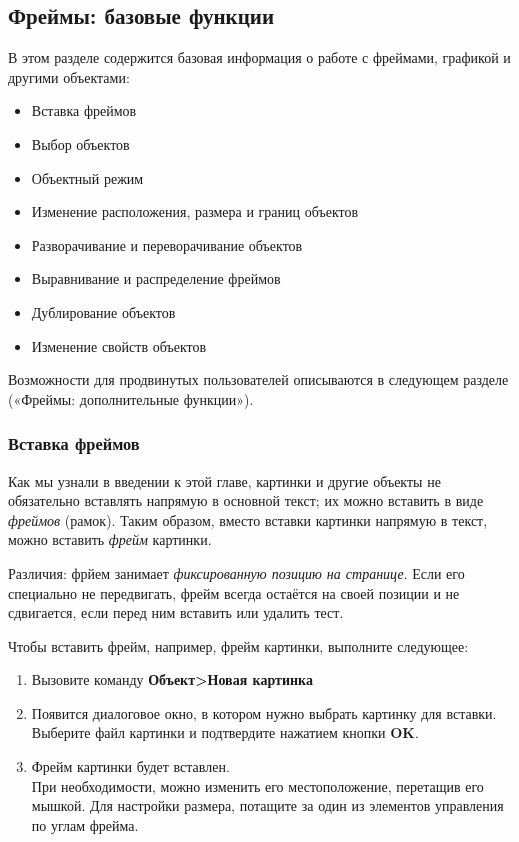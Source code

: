 ﻿\documentclass[a4paper,10pt]{article}
\begin{document}
\subsection{Фреймы: базовые функции}
В этом разделе содержится базовая информация о работе с фреймами, графикой и другими объектами:

\begin{itemize}
 \item Вставка фреймов
 \item Выбор объектов
 \item Объектный режим
 \item Изменение расположения, размера и границ объектов
 \item Разворачивание и переворачивание объектов
 \item Выравнивание и распределение фреймов
 \item Дублирование объектов
 \item Изменение свойств объектов
\end{itemize}

Возможности для продвинутых пользователей описываются в следующем разделе («Фреймы: дополнительные функции»).

\subsubsection{Вставка фреймов}
Как мы узнали в введении к этой главе, картинки и другие объекты не обязательно вставлять напрямую в основной текст; их можно вставить в виде \textit{фреймов} (рамок). Таким образом, вместо вставки картинки напрямую в текст, можно вставить \textit{фрейм} картинки.

Различия: фрйем занимает \textit{фиксированную позицию на странице}. Если его специально не передвигать, фрейм всегда остаётся на своей позиции и не сдвигается, если перед ним вставить или удалить тест.

Чтобы вставить фрейм, например, фрейм картинки, выполните следующее:

\begin{enumerate}
 \item Вызовите команду \textbf{Объект>Новая картинка}
 \item Появится диалоговое окно, в котором нужно выбрать картинку для вставки. Выберите файл картинки и подтвердите нажатием кнопки \textbf{OK}.
 \item Фрейм картинки будет вставлен.\\
 При необходимости, можно изменить его местоположение, перетащив его мышкой. Для настройки размера, потащите за один из элементов управления по углам фрейма.
\end{enumerate}
\end{document}
